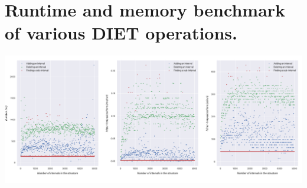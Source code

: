 \section{Runtime and memory benchmark of various DIET operations.}
\label{app:diet-bench}

\includegraphics[width=\textwidth]{images/diet_benchs.png}